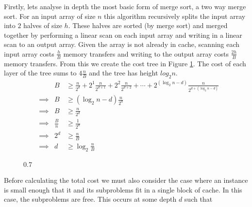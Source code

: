 \documentclass[11pt, letterpaper]{article}
\begin{document}
Firstly, lets analyse in depth the most basic form of merge sort, a two way merge sort. For an input array of size $n$ this algorithm recursively splits the input array into $2$ halves of size $h$. These halves are sorted (by merge sort) and merged together by performing a linear scan on each input array and writing in a linear scan to an output array. Given the array is not already in cache, scanning each input array costs $\frac{h}{B}$ memory transfers and writing to the output array costs $\frac{2h}{B}$ memory transfers. From this we create the cost tree in Figure \ref{fig:two-way-merge-sort-cost-tree}. The cost of each layer of the tree sums to $4\frac{n}{B}$ and the tree has height $log_2n$.
\begin{align*}
    && B &\geq 
    \frac{n}{2^d} + 2^1\frac{n}{2^{d + 1}} + 2^2\frac{n}{2^{d + 2}} + \cdots + 2^{(  \log_2n - d ) }\frac{n}{2^{d + (\log_2n - d)}} 
    \\ 
    & \implies 
    & B &\geq 
    (\log_2n - d)\frac{n}{2^{d}}
    \\ 
    & \implies 
    & B &\geq 
    \frac{n}{2^{d}}
    \\ 
    & \implies 
    & \frac{B}{n} &\geq 
    \frac{1}{2^{d}}
    \\ 
    & \implies 
    & 2^{d} &\geq
    \frac{n}{B} 
    \\ 
    & \implies 
    & d &\geq
    \log_2\frac{n}{B} 
\end{align*}
\begin{figure}
\begin{center}
\begin{scalebox}{0.7}{
}
\label{fig:two-way-merge-sort-cost-tree}
\end{scalebox}
\end{center}
\end{figure}
Before calculating the total cost we must also consider the case where an instance is small enough that it and its subproblems fit in a single block of cache. In this case, the subproblems are free. This occurs at some depth $d$ such that
\end{document}
